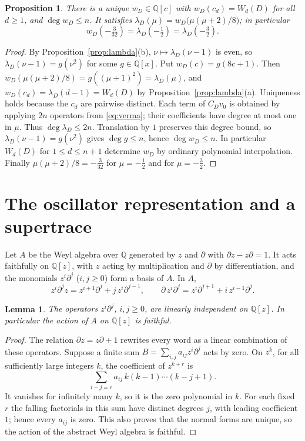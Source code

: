 \documentclass[preprint,12pt]{elsarticle}
\newtheorem{proposition}[theorem]{Proposition}
\newtheorem{lemma}[theorem]{Lemma}
\theoremstyle{definition}
\newcommand{\Q}{\mathbb{Q}}
\newcommand{\dd}{\partial}
\begin{document}
\begin{proposition}\label{prop:wD}
There is a unique $w_D\in\Q[c]$ with $w_D(c_d)=W_d(D)$ for all $d\ge1$, and $\deg w_D\le n$. It satisfies $\lambda_D(\mu)=w_D\bigl(\mu(\mu+2)/8\bigr)$; in particular
\[
w_D(-\tfrac{3}{32})=\lambda_D(-\tfrac12)=\lambda_D(-\tfrac32).
\]
\end{proposition}

\begin{proof}
By Proposition~\ref{prop:lambda}(b), $\nu\mapsto\lambda_D(\nu-1)$ is even, so $\lambda_D(\nu-1)=g(\nu^2)$ for some $g\in\Q[x]$. Put $w_D(c)=g(8c+1)$. Then $w_D(\mu(\mu+2)/8)=g((\mu+1)^2)=\lambda_D(\mu)$, and $w_D(c_d)=\lambda_D(d-1)=W_d(D)$ by Proposition~\ref{prop:lambda}(a). Uniqueness holds because the $c_d$ are pairwise distinct. Each term of $C_Dv_0$ is obtained by applying $2n$ operators from \eqref{eq:verma}; their coefficients have degree at most one in $\mu$. Thus $\deg\lambda_D\le2n$. Translation by $1$ preserves this degree bound, so $\lambda_D(\nu-1)=g(\nu^2)$ gives $\deg g\le n$, hence $\deg w_D\le n$. In particular $W_d(D)$ for $1\le d\le n+1$ determine $w_D$ by ordinary polynomial interpolation. Finally $\mu(\mu+2)/8=-\frac{3}{32}$ for $\mu=-\frac12$ and for $\mu=-\frac32$.
\end{proof}

\section{The oscillator representation and a supertrace}\label{sec:osc}

Let $A$ be the Weyl algebra over $\Q$ generated by $z$ and $\dd$ with $\dd z-z\dd=1$. It acts faithfully on $\Q[z]$, with $z$ acting by multiplication and $\dd$ by differentiation, and the monomials $z^i\dd^j$ ($i,j\ge0$) form a basis of $A$. In $A$,
\begin{equation}\label{eq:weyl}
z^i\dd^j z=z^{i+1}\dd^j+j\,z^i\dd^{j-1},\qquad \dd\, z^i\dd^j=z^i\dd^{j+1}+i\,z^{i-1}\dd^j .
\end{equation}

\begin{lemma}\label{lem:faithful}
The operators $z^i\dd^j$, $i,j\ge0$, are linearly independent on $\Q[z]$. In particular the action of $A$ on $\Q[z]$ is faithful.
\end{lemma}

\begin{proof}
The relation $\dd z=z\dd+1$ rewrites every word as a linear combination of these operators. Suppose a finite sum $B=\sum_{i,j}a_{ij}z^i\dd^j$ acts by zero. On $z^k$, for all sufficiently large integers $k$, the coefficient of $z^{k+r}$ is
\[
\sum_{i-j=r}a_{ij}\,k(k-1)\cdots(k-j+1).
\]
It vanishes for infinitely many $k$, so it is the zero polynomial in $k$. For each fixed $r$ the falling factorials in this sum have distinct degrees $j$, with leading coefficient $1$; hence every $a_{ij}$ is zero. This also proves that the normal forms are unique, so the action of the abstract Weyl algebra is faithful.
\end{proof}
\end{document}
